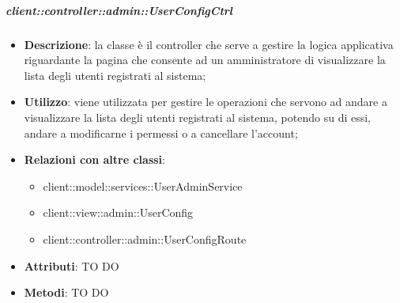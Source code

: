 		\subparagraph{client::controller::admin::UserConfigCtrl} %
		\label{subp:bdsm_app_client_controller_admin_userconfigctrl}
			\begin{itemize}
				\item \textbf{Descrizione}: la classe è il controller che serve a gestire la logica applicativa riguardante la pagina che consente ad un amministratore di visualizzare la lista degli utenti registrati al sistema;
				\item \textbf{Utilizzo}: viene utilizzata per gestire le operazioni che servono ad andare a visualizzare la lista degli utenti registrati al sistema, potendo su di essi, andare a modificarne i permessi o a cancellare l'account;
				\item \textbf{Relazioni con altre classi}:
					\begin{itemize}
						\item client::model::services::UserAdminService
						\item client::view::admin::UserConfig
						\item client::controller::admin::UserConfigRoute
					\end{itemize}
				\item \textbf{Attributi}: TO DO
				\item \textbf{Metodi}: TO DO
			\end{itemize}


